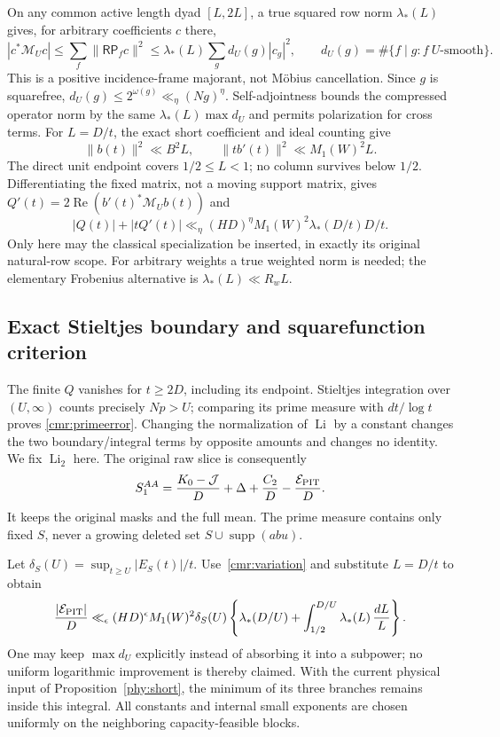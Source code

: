 On any common active length dyad $[L,2L]$, a true squared row norm
$\lambda_*(L)$ gives, for arbitrary coefficients $c$ there,
\[
 |c^*\mathcal M_Uc|
 \le\sum_f\|\mathsf R\mathsf P_fc\|^2
 \le\lambda_*(L)\sum_g d_U(g)|c_g|^2,
 \qquad d_U(g)=\#\{f\mid g:f\ U\text{-smooth}\}.
\]
This is a positive incidence-frame majorant, not M\"obius cancellation.
Since $g$ is squarefree, $d_U(g)\le2^{\omega(g)}\ll_\eta(Ng)^\eta$.
Self-adjointness bounds the compressed operator norm by the same
$\lambda_*(L)\max d_U$ and permits polarization for cross terms.
For $L=D/t$, the exact short coefficient and ideal counting give
\[
 \|b(t)\|^2\ll B^2L,\qquad
 \|tb'(t)\|^2\ll M_1(W)^2L.
\]
The direct unit endpoint covers $1/2\le L<1$; no column survives below
$1/2$. Differentiating the fixed matrix, not a moving support matrix,
gives $Q'(t)=2\operatorname{Re}(b'(t)^*\mathcal M_Ub(t))$ and
\begin{equation}\label{cmr:variation}
 |Q(t)|+|tQ'(t)|\ll_\eta(HD)^\eta
                     M_1(W)^2\lambda_*(D/t)D/t.
\end{equation}
Only here may the classical specialization be inserted, in exactly
its original natural-row scope. For arbitrary weights a true
weighted norm is needed; the elementary Frobenius alternative is
$\lambda_*(L)\ll R_wL$.

\subsection{Exact Stieltjes boundary and squarefunction criterion}
\label{cmr:stieltjes-proof}
The finite $Q$ vanishes for $t\ge2D$, including its endpoint.
Stieltjes integration over $(U,\infty)$ counts precisely $Np>U$;
comparing its prime measure with $dt/\log t$ proves
\eqref{cmr:primeerror}. Changing the normalization of $\operatorname{Li}$
by a constant changes the two boundary/integral terms by opposite
amounts and changes no identity. We fix $\operatorname{Li}_2$ here.
The original raw slice is consequently
\[
 S_1^{AA}=\frac{K_0-\mathcal J}D+\Delta+\frac{C_2}D
                                   -\frac{\mathcal E_{\rm PIT}}D.
\]
It keeps the original masks and the full mean. The prime measure
contains only fixed $S$, never a growing deleted set
$S\cup\operatorname{supp}(abu)$.

Let $\delta_S(U)=\sup_{t\ge U}|E_S(t)|/t$.
Use~\eqref{cmr:variation} and substitute $L=D/t$ to obtain
\begin{equation}\label{cmr:pointwise-budget}
 \frac{|\mathcal E_{\rm PIT}|}D
 \ll_\epsilon(HD)^\epsilon M_1(W)^2\delta_S(U)
 \left\{\lambda_*(D/U)+
        \int_{1/2}^{D/U}\lambda_*(L)\,\frac{dL}{L}\right\}.
\end{equation}
One may keep $\max d_U$ explicitly instead of absorbing it into a
subpower; no uniform logarithmic improvement is thereby claimed.
With the current physical input of Proposition~\ref{phy:short}, the minimum of
its three branches remains inside this integral. All constants and
internal small exponents are chosen uniformly on the neighboring
capacity-feasible blocks.

